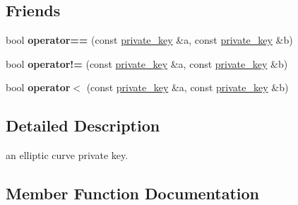 \subsection*{Friends}
\begin{DoxyCompactItemize}
\item 
\mbox{\label{classfc_1_1crypto_1_1r1_1_1private__key_af279e37c180aa326645bdb542b9be656}} 
bool {\bfseries operator==} (const \mbox{\hyperlink{classfc_1_1crypto_1_1r1_1_1private__key}{private\+\_\+key}} \&a, const \mbox{\hyperlink{classfc_1_1crypto_1_1r1_1_1private__key}{private\+\_\+key}} \&b)
\item 
\mbox{\label{classfc_1_1crypto_1_1r1_1_1private__key_a542c2210ae96b8326314deb182aef678}} 
bool {\bfseries operator!=} (const \mbox{\hyperlink{classfc_1_1crypto_1_1r1_1_1private__key}{private\+\_\+key}} \&a, const \mbox{\hyperlink{classfc_1_1crypto_1_1r1_1_1private__key}{private\+\_\+key}} \&b)
\item 
\mbox{\label{classfc_1_1crypto_1_1r1_1_1private__key_a07832f781f3f9ce28ecba02777a9c6df}} 
bool {\bfseries operator$<$} (const \mbox{\hyperlink{classfc_1_1crypto_1_1r1_1_1private__key}{private\+\_\+key}} \&a, const \mbox{\hyperlink{classfc_1_1crypto_1_1r1_1_1private__key}{private\+\_\+key}} \&b)
\end{DoxyCompactItemize}


\subsection{Detailed Description}
an elliptic curve private key. 

\subsection{Member Function Documentation}
\mbox{\label{classfc_1_1crypto_1_1r1_1_1private__key_a809607decbd4c04217994a2a5d225dc7}} 
